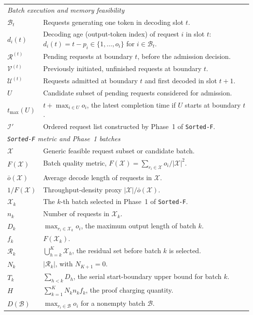 \documentclass[nonblindrev]{informs3_hide}
\newcommand{\sortF}{\texttt{Sorted-F}}
\begin{document}
\begin{longtable}{p{}p{}}
\midrule
\multicolumn{2}{l}{\textit{Batch execution and memory feasibility}}\\
$\mathcal B_t$ & Requests generating one token in decoding slot $t$. \\
$d_i(t)$ & Decoding age (output-token index) of request $i$ in slot $t$: $d_i(t)=t-p_i\in\{1,\ldots,o_i\}$ for $i\in\mathcal B_t$. \\
$\mathcal R^{(t)}$ & Pending requests at boundary $t$, before the admission decision. \\
$\mathcal V^{(t)}$ & Previously initiated, unfinished requests at boundary $t$. \\
$\mathcal U^{(t)}$ & Requests admitted at boundary $t$ and first decoded in slot $t+1$. \\
$U$ & Candidate subset of pending requests considered for admission. \\
$t_{\max}(U)$ & $t+\max_{i\in U}o_i$, the latest completion time if $U$ starts at boundary $t$. \\
$\mathcal I'$ & Ordered request list constructed by Phase~1 of \sortF{}. \\

\midrule
\multicolumn{2}{l}{\textit{\sortF{} metric and Phase~1 batches}}\\
$\mathcal X$ & Generic feasible request subset or candidate batch. \\
$F(\mathcal X)$ & Batch quality metric, $F(\mathcal X)=\sum_{r_i\in\mathcal X}o_i/|\mathcal X|^2$. \\
$\bar o(\mathcal X)$ & Average decode length of requests in $\mathcal X$. \\
$1/F(\mathcal X)$ & Throughput-density proxy $|\mathcal X|/\bar o(\mathcal X)$. \\
$\mathcal X_k$ & The $k$-th batch selected in Phase~1 of \sortF{}. \\
$n_k$ & Number of requests in $\mathcal X_k$. \\
$D_k$ & $\max_{r_i\in\mathcal X_k}o_i$, the maximum output length of batch $k$. \\
$f_k$ & $F(\mathcal X_k)$. \\
$\mathcal R_k$ & $\bigcup_{h=k}^K\mathcal X_h$, the residual set before batch $k$ is selected. \\
$N_k$ & $|\mathcal R_k|$, with $N_{K+1}=0$. \\
$T_k$ & $\sum_{h<k}D_h$, the serial start-boundary upper bound for batch $k$. \\
$H$ & $\sum_{k=1}^K N_kn_kf_k$, the proof charging quantity. \\
$D(\mathcal B)$ & $\max_{r_i\in\mathcal B}o_i$ for a nonempty batch $\mathcal B$. \\


\end{longtable}
\end{document}
